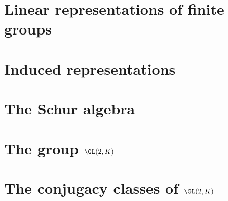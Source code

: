 \documentclass[../main.tex]{subfiles}
\begin{document}
\section{Linear representations of finite groups}

\section{Induced representations}

\section{The Schur algebra}

\section{The group \texorpdfstring{$\GL(2,K)$}{ GL(2,K)}}

\section{The conjugacy classes of \texorpdfstring{$\GL(2,K)$}{ GL(2,K)}}
\end{document}
